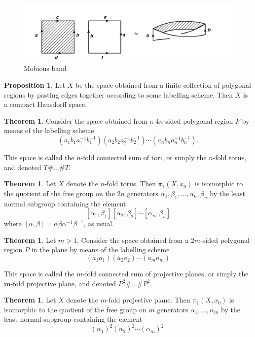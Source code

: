 \documentclass[12pt,a4paper]{book}
\theoremstyle{definition}
\newtheorem{theo}[defn]{Theorem}
\newtheorem{prop}[defn]{Proposition}
\begin{document}
\begin{figure}[H]
    \includegraphics[scale=0.7]{mobi1.png}
    \centering
    \caption{Mobious band}
\end{figure}
\begin{prop}
    Let $X$ be the space obtained from a finite collection of polygonal regions by pasting edges together according to some labelling scheme. Then $X$ is a compact Hausdorff space.
\end{prop}
\begin{theo}
    Consider the space obtained from a $4 n$-sided polygonal region $P$ by means of the labelling scheme
    $$
        \left(a_1 b_1 a_1^{-1} b_1^{-1}\right)\left(a_2 b_2 a_2^{-1} b_2^{-1}\right) \cdots\left(a_n b_n a_n^{-1} b_n^{-1}\right) .
    $$

    This space is called the $n$-fold connected sum of tori, or simply the $n$-fold torus, and denoted $T \# \ldots \# T$.
\end{theo}
\begin{theo}
    Let $X$ denote the $n$-fold torus. Then $\pi_1\left(X, x_0\right)$ is isomorphic to the quotient of the free group on the $2 n$ generators $\alpha_1, \beta_1, \ldots, \alpha_n, \beta_n$ by the least normal subgroup containing the element
    $$
        \left[\alpha_1, \beta_1\right]\left[\alpha_2, \beta_2\right] \cdots\left[\alpha_n, \beta_n\right]
    $$
    where $[\alpha, \beta]=\alpha \beta \alpha^{-1} \beta^{-1}$, as usual.
\end{theo}
\begin{theo}
    Let $m>1$. Consider the space obtained from a $2 m$-sided polygonal region $P$ in the plane by means of the labelling scheme
    $$
        \left(a_1 a_1\right)\left(a_2 a_2\right) \cdots\left(a_m a_m\right)
    $$

    This space is called the $m$-fold connected sum of projective planes, or simply the $\boldsymbol{m}$-fold projective plane, and denoted $P^2 \# \ldots \# P^2$.
\end{theo}
\begin{theo}
    Let $X$ denote the $m$-fold projective plane. Then $\pi_1\left(X, x_0\right)$ is isomorphic to the quotient of the free group on $m$ generators $\alpha_1, \ldots, \alpha_m$ by the least normal subgroup containing the element
    $$
        \left(\alpha_1\right)^2\left(\alpha_2\right)^2 \cdots\left(\alpha_m\right)^2 .
    $$
\end{theo}
\end{document}
